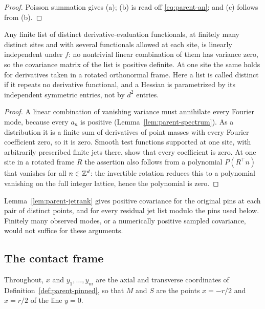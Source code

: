 \begin{proof}
Poisson summation gives (a); (b) is read off \eqref{eq:parent-an}; and (c) follows from (b).
\end{proof}

\begin{lemma}\label{lem:parent-jetrank}
Any finite list of distinct derivative-evaluation functionals, at finitely many distinct sites and with several functionals allowed at each site, is linearly independent under $f$: no nontrivial linear combination of them has variance zero, so the covariance matrix of the list is positive definite. At one site the same holds for derivatives taken in a rotated orthonormal frame. Here a list is called distinct if it repeats no derivative functional, and a Hessian is parametrized by its independent symmetric entries, not by $d^2$ entries.
\end{lemma}

\begin{proof}
A linear combination of vanishing variance must annihilate every Fourier mode, because every $a_n$ is positive (Lemma~\ref{lem:parent-spectrum}). As a distribution it is a finite sum of derivatives of point masses with every Fourier coefficient zero, so it is zero. Smooth test functions supported at one site, with arbitrarily prescribed finite jets there, show that every coefficient is zero. At one site in a rotated frame $R$ the assertion also follows from a polynomial $P(R^{\top}n)$ that vanishes for all $n\in\mathbb Z^d$: the invertible rotation reduces this to a polynomial vanishing on the full integer lattice, hence the polynomial is zero.
\end{proof}

Lemma~\ref{lem:parent-jetrank} gives positive covariance for the original pins at each pair of distinct points, and for every residual jet list modulo the pins used below. Finitely many observed modes, or a numerically positive sampled covariance, would not suffice for these arguments.

\subsection{The contact frame}\label{ssec:parent-frame}

Throughout, $x$ and $y_1,\dots,y_m$ are the axial and transverse coordinates of Definition~\ref{def:parent-pinned}, so that $M$ and $S$ are the points $x=-r/2$ and $x=r/2$ of the line $y=0$.

